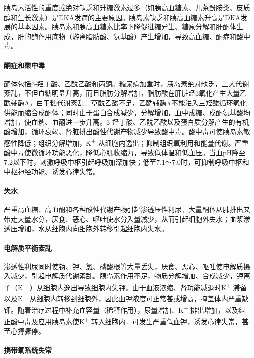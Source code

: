 胰岛素活性的重度或绝对缺乏和升糖激素过多（如胰高血糖素、儿茶酚胺类、皮质醇和生长激素）是DKA发病的主要原因。胰岛素缺乏和胰高血糖素升高是DKA发展的基本因素。胰岛素和胰高血糖素比率下降促进糖异生、糖原分解和肝酮体生成，肝的酶作用底物（游离脂肪酸、氨基酸）产生增加，导致高血糖、酮症和酸中毒。

\paragraph{酮症和酸中毒}

酮体包括β-羟丁酸、乙酰乙酸和丙酮。糖尿病加重时，胰岛素绝对缺乏，三大代谢紊乱，不但血糖明显升高，而且脂肪分解增加，脂肪酸在肝脏经β氧化产生大量乙酰辅酶A，由于糖代谢紊乱、草酰乙酸不足，乙酰辅酶A不能进入三羟酸循环氧化供能而缩合成酮体；同时由于蛋白合成减少，分解增加，血中成糖、成酮氨基酸均增加，使血糖、血酮进一步升高。β-羟丁酸、乙酰乙酸以及蛋白质分解产生的有机酸增加，循环衰竭、肾脏排出酸性代谢产物减少导致酸中毒。酸中毒可使胰岛素敏感性降低；组织分解增加，K\textsuperscript{+}
从细胞内逸出；抑制组织氧利用和能量代谢。严重酸中毒使微循环功能恶化，降低心肌收缩力，导致低体温和低血压。当血pH降至7.2以下时，刺激呼吸中枢引起呼吸加深加快；低至7.1～7.0时，可抑制呼吸中枢和中枢神经功能、诱发心律失常。

\paragraph{失水}

严重高血糖、高血酮和各种酸性代谢产物引起渗透压性利尿，大量酮体从肺排出又带走大量水分，厌食、恶心、呕吐使水分入量减少，从而引起细胞外失水；血浆渗透压增加，水从细胞内向细胞外转移引起细胞内失水。

\paragraph{电解质平衡紊乱}

渗透性利尿同时使钠、钾、氯、磷酸根等大量丢失，厌食、恶心、呕吐使电解质摄入减少，引起电解质代谢紊乱。胰岛素作用不足，物质分解增加、合成减少，钾离子（K\textsuperscript{+}
）从细胞内逸出导致细胞内失钾。由于血液浓缩、肾功能减退时K\textsuperscript{+}
滞留以及K\textsuperscript{+}
从细胞内转移到细胞外，因此血钾浓度可正常甚或增高，掩盖体内严重缺钾。随着治疗过程中补充血容量（稀释作用），尿量增加、K\textsuperscript{+}
排出增加，以及纠正酸中毒及应用胰岛素使K\textsuperscript{+}
转入细胞内，可发生严重低血钾，诱发心律失常，甚至心搏骤停。

\paragraph{携带氧系统失常}


